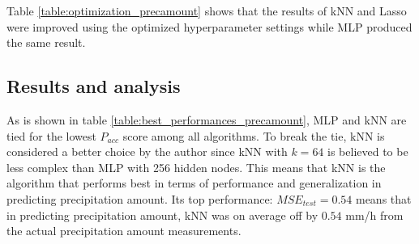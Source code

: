 	Table \ref{table:optimization_precamount} shows that the results of kNN and Lasso were improved using the optimized hyperparameter settings while MLP produced the same result.

	\subsection{Results and analysis} \label{sec:results_precamount}

	\begin{table}[H]
		\centering
		\caption{Shows the overall optimized settings and performances for each of the algorithms in predicting precipitation amount. The best performing algorithms are highlighted. }
	\end{table}

	As is shown in table \ref{table:best_performances_precamount}, MLP and kNN are tied for the lowest $P_{acc}$ score among all algorithms. To break the tie, kNN is considered a better choice by the author since kNN with $k=64$ is believed to be less complex than MLP with 256 hidden nodes. This means that kNN is the algorithm that performs best in terms of performance and generalization in predicting precipitation amount. Its top performance:  $MSE_{test} = 0.54$ means that in predicting precipitation amount, kNN was on average off by $0.54$ mm/h from the actual precipitation amount measurements. %


